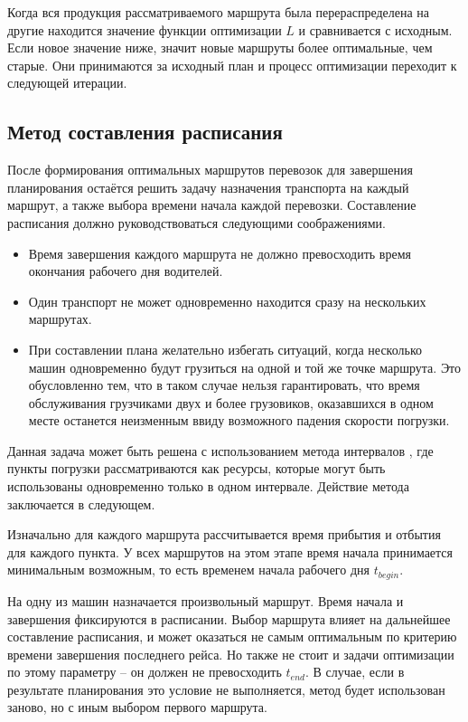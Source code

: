 	Когда вся продукция рассматриваемого маршрута была перераспределена на другие находится значение функции оптимизации $L$ и сравнивается с исходным. Если новое значение ниже, значит новые маршруты более оптимальные, чем старые. Они принимаются за исходный план и процесс оптимизации переходит к следующей итерации.

\subsection{Метод составления расписания}
После формирования оптимальных маршрутов перевозок для завершения планирования остаётся решить задачу назначения транспорта на каждый маршрут, а также выбора времени начала каждой перевозки. Составление расписания должно руководствоваться следующими соображениями.

\begin{itemize}
	\item Время завершения каждого маршрута не должно превосходить время окончания рабочего дня водителей.
	\item Один транспорт не может одновременно находится сразу на нескольких маршрутах.
	\item При составлении плана желательно избегать ситуаций, когда несколько машин одновременно будут грузиться на одной и той же точке маршрута. Это обусловленно тем, что в таком случае нельзя гарантировать, что время обслуживания грузчиками двух и более грузовиков, оказавшихся в одном месте останется неизменным ввиду возможного падения скорости погрузки.
\end{itemize}

Данная задача может быть решена с использованием метода интервалов \cite{schedule:intervals}, где пункты погрузки рассматриваются как ресурсы, которые могут быть использованы одновременно только в одном интервале. Действие метода заключается в следующем.

Изначально для каждого маршрута рассчитывается время прибытия и отбытия для каждого пункта. У всех маршрутов на этом этапе время начала принимается минимальным возможным, то есть временем начала рабочего дня $t_{begin}$.

На одну из машин назначается произвольный маршрут. Время начала и завершения фиксируются в расписании. Выбор маршрута влияет на дальнейшее составление расписания, и может оказаться не самым оптимальным по критерию времени завершения последнего рейса. Но также не стоит и задачи оптимизации по этому параметру -- он должен не превосходить $t_{end}$. В случае, если в результате планирования это условие не выполняется, метод будет использован заново, но с иным выбором первого маршрута.

